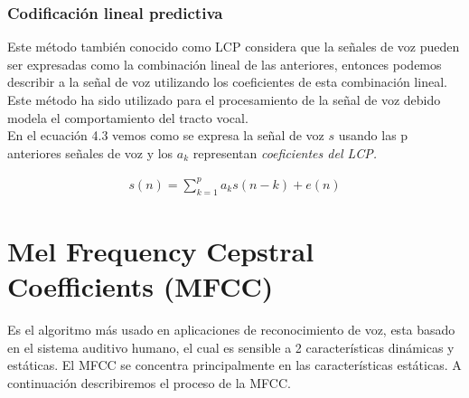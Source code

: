 \subsubsection{Codificación lineal predictiva} 
Este método también conocido como LCP considera que la señales de voz pueden ser expresadas como la combinación lineal de las anteriores, entonces podemos describir a la señal de voz utilizando los coeficientes de esta combinación lineal. Este método ha sido utilizado para el procesamiento de la señal de voz debido modela el comportamiento del tracto vocal.\\ En el ecuación 4.3 vemos como se expresa la señal de voz $s$ usando las p anteriores señales de voz y los $a_{k}$ representan \textit{coeficientes del LCP.}

\begin{equation}
\label{LPC}
\begin{aligned}
s(n)= \sum_{k=1}^{p}a_{k}s(n-k)+e(n)
\end{aligned}
\end{equation}

\section{Mel Frequency Cepstral Coefficients (MFCC)}\label{MFCC}
Es el algoritmo más usado en aplicaciones de reconocimiento de voz, esta basado en el sistema auditivo humano, el cual es sensible a 2 características dinámicas y estáticas. El MFCC se concentra principalmente en las características estáticas. A continuación describiremos el proceso de la MFCC.

